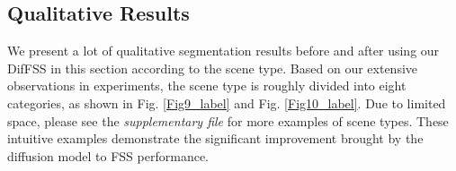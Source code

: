 \documentclass[sigconf]{acmart}
\begin{document}
\begin{table}[tb]
\caption{Comparison of different control conditions for BAM \cite{BAM2022} and HDMNet\cite{HDMNet2023}) on PASCAL-. The value preceding ``/'' in ``Gain rate'' column represents the mIoU gain achieved by utilizing the diffusion model (one support image and four auxiliary images) in comparison to the 1-shot setting, whereas the value succeeding ``/'' represents the mIoU gain obtained by using the 5-shot setting as opposed to the 1-shot setting.}
\label{table_Ablation1}
\end{table}




\subsection{Qualitative Results}
We present a lot of qualitative segmentation results before and after using our DifFSS in this section according to the scene type. Based on our extensive observations in experiments, the scene type is roughly divided into eight categories, as shown in Fig. \ref{Fig9_label} and Fig. \ref{Fig10_label}. Due to limited space, please see the \textit{supplementary file} for more examples of scene types. These intuitive examples demonstrate the significant improvement brought by the diffusion model to FSS performance.
\end{document}
